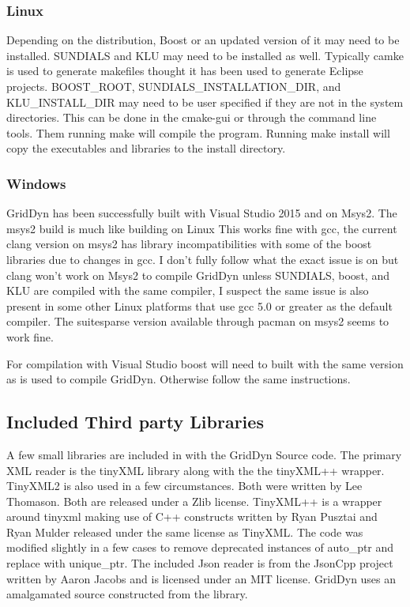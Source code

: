 \documentclass[12pt]{article} %
\begin{document}
\subsubsection{Linux}
Depending on the distribution, Boost or an updated version of it may need to be installed.  SUNDIALS and KLU may need to be installed as well.  Typically camke is used to generate makefiles thought it has been used to generate Eclipse projects.    BOOST\_ROOT, SUNDIALS\_INSTALLATION\_DIR, and KLU\_INSTALL\_DIR may need to be user specified if they are not in the system directories.  This can be done in the cmake-gui or through the command line tools.  Them running make will compile the program.
Running make install will copy the executables and libraries to the install directory.

\subsubsection{Windows}
GridDyn has been successfully built with Visual Studio 2015 and on Msys2.  The msys2 build is much like building on Linux  This works fine with gcc,  the current clang version on msys2 has library incompatibilities with some of the boost libraries due to changes in gcc.  I don't fully follow what the exact issue is on but clang won't work on Msys2 to compile GridDyn unless SUNDIALS, boost, and KLU are compiled with the same compiler, I suspect the same issue is also present in some other Linux platforms that use gcc 5.0 or greater as the default compiler.  The suitesparse version available through pacman on msys2 seems to work fine.

For compilation with Visual Studio boost will need to built with the same version as is used to compile GridDyn.  Otherwise follow the same instructions.

\subsection{Included Third party Libraries}
A few small libraries are included in with the GridDyn Source code.  The primary XML reader is the tinyXML library along with the the tinyXML++ wrapper.  TinyXML2 is also used in a few circumstances.  Both were written by Lee Thomason.  Both are released under a Zlib license.  TinyXML++ is a wrapper around tinyxml making use of C++ constructs written by Ryan Pusztai and Ryan Mulder released under the same license as TinyXML.  The code was modified slightly in a few cases to remove deprecated instances of auto\_ptr and replace with unique\_ptr.  The included Json reader is from the JsonCpp project written by Aaron Jacobs and is licensed under an MIT license.  GridDyn uses an amalgamated source constructed from the library.
\end{document}
